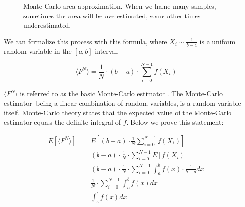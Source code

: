\documentclass{PoliMi_MasterThesis}
\begin{document}
\begin{figure}[H]
    \centering
	\qquad
	\caption{Monte-Carlo area approximation. When we hame many samples, sometimes the area will be overestimated, some other times underestimated.}
    \label{fig:monte_carlo_area_approximation}
\end{figure}

We can formalize this process with this formula, where $X_i \sim \frac{1}{b-a}$ is a uniform random variable in the $[a,b]$ interval. 

$$\langle F^N \rangle = \frac{1}{N}\cdot (b-a)\cdot\sum_{i=0}^{N-1}\textit{f}(X_i)$$

$\langle F^N \rangle$ is referred to as the basic Monte-Carlo estimator \cite{monte_carlo_estimators_veach} \cite{monte_carlo_estimators_scratchapixel}. The Monte-Carlo estimator, being a linear combination of random variables, is a random variable itself. Monte-Carlo theory states that the expected value of the Monte-Carlo estimator equals the definite integral of $f$. Below we prove this statement:

\begin{subequations}
	\begin{align*}
		E[\langle F^N \rangle] &= E[(b-a)\cdot \frac{1}{N}\sum_{i=0}^{N-1}\textit{f}(X_i)] \\
		&= (b-a)\cdot \frac{1}{N}\cdot\sum_{i=0}^{N-1} E[\textit{f}(X_i)] \\
		&= (b-a)\cdot \frac{1}{N}\cdot\sum_{i=0}^{N-1}\int_{a}^{b}\textit{f}(x) \cdot \frac{1}{b-a} dx \\
		&= \frac{1}{N}\cdot\sum_{i=0}^{N-1}\int_{a}^{b}\textit{f}(x) dx \\
		&= \int_{a}^{b}\textit{f}(x) dx
	\end{align*}
\end{subequations}
\end{document}
